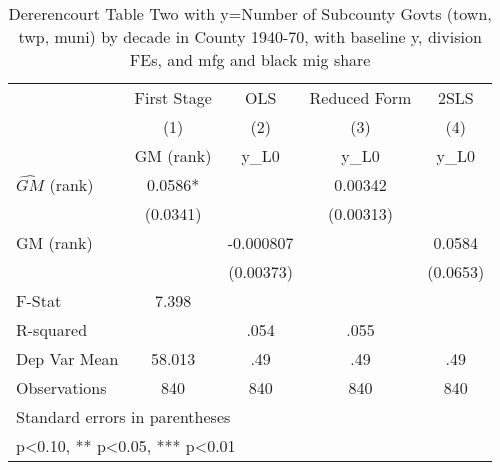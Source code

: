 \begin{table}[htbp]\centering
\def\sym#1{\ifmmode^{#1}\else\(^{#1}\)\fi}
\caption{Dererencourt Table Two with y=Number of Subcounty Govts (town, twp, muni) by decade in County 1940-70, with baseline y, division FEs, and mfg and black mig share}
\begin{tabular}{l*{4}{c}}
\toprule
                    & First Stage   &         OLS   &Reduced Form   &        2SLS   \\
                    &\multicolumn{1}{c}{(1)}&\multicolumn{1}{c}{(2)}&\multicolumn{1}{c}{(3)}&\multicolumn{1}{c}{(4)}\\
                    &\multicolumn{1}{c}{GM  (rank)}&\multicolumn{1}{c}{y\_L0}&\multicolumn{1}{c}{y\_L0}&\multicolumn{1}{c}{y\_L0}\\
\midrule
$\hat{GM}$ (rank)   &      0.0586*  &               &     0.00342   &               \\
                    &    (0.0341)   &               &   (0.00313)   &               \\
\addlinespace
GM  (rank)          &               &   -0.000807   &               &      0.0584   \\
                    &               &   (0.00373)   &               &    (0.0653)   \\
\midrule
F-Stat              &       7.398   &               &               &               \\
R-squared           &               &        .054   &        .055   &               \\
Dep Var Mean        &      58.013   &         .49   &         .49   &         .49   \\
Observations        &         840   &         840   &         840   &         840   \\
\bottomrule
\multicolumn{5}{l}{\footnotesize Standard errors in parentheses}\\
\multicolumn{5}{l}{\footnotesize * p<0.10, ** p<0.05, *** p<0.01}\\
\end{tabular}
\end{table}
